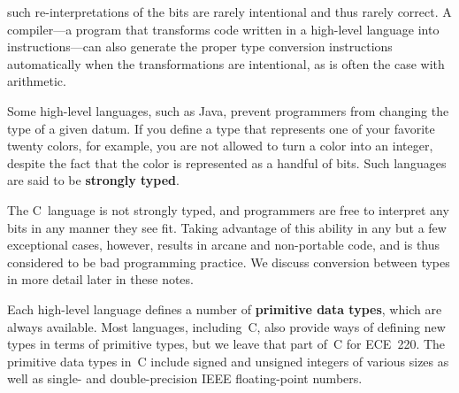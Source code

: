 \pagebreak

such re-interpretations of the
bits are rarely intentional and thus rarely correct.  A compiler---a
program that transforms code written in a high-level language into
instructions---can also generate the proper type conversion instructions 
automatically when the 
transformations are intentional, as is often the case with arithmetic.

Some high-level languages, such as Java, 
prevent programmers from changing the type of a given datum.
If you define a type that represents one of your
favorite twenty colors, for example, you are not allowed to turn a
color into an integer, despite the fact that the color is represented
as a handful of bits.  Such languages are said to be {\bf strongly
typed}.  

The C~language is not strongly typed, and programmers are free to
interpret any bits in any manner they see fit.  Taking advantage of
this ability in any but a few exceptional cases, however, 
results in arcane and non-portable code, and is thus considered to be
bad programming practice.  We discuss conversion between types in more
detail later in these notes.

Each high-level language defines a number of {\bf primitive data
types}, which are always available.  Most languages, including~C,
also provide ways of defining new types in terms of primitive types,
but we leave that part of~C for ECE~220.
%
The primitive data types in~C include signed and unsigned integers of various
sizes as well as single- and double-precision IEEE floating-point numbers.\vspace{2pt}

